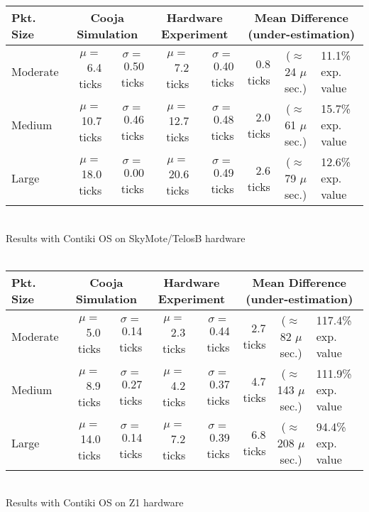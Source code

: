 \documentclass[a4paper,10pt]{article}
\begin{document}
\begin{sidewaystable}[!p]
\centering

\newcommand{\ticks}[1]{#1 ticks}
\newcommand{\moy}[1]{$\mu=$ \ticks{#1}}
\newcommand{\ect}[1]{$\sigma=$ \ticks{#1}}
\newcommand{\estus}[1]{($\approx$ #1 $\mu$sec.)}
\newcommand{\prctv}[1]{#1\% exp. value}

\begin{tabular}{|l|rr|rr|rcl|}
\hline
Pkt. Size & \multicolumn{2}{c|}{Cooja Simulation}
          & \multicolumn{2}{c|}{Hardware Experiment}
          & \multicolumn{3}{c|}{Mean Difference (under-estimation)} \\
\hline
 Moderate & \moy{6.4} & \ect{0.50} & \moy{7.2} & \ect{0.40}
          & 0.8 ticks & \estus{24} & \prctv{11.1} \\
 Medium   & \moy{10.7} & \ect{0.46} & \moy{12.7} & \ect{0.48}
          & 2.0 ticks & \estus{61} & \prctv{15.7} \\
 Large    & \moy{18.0} & \ect{0.00} & \moy{20.6} & \ect{0.49}
          & 2.6 ticks & \estus{79} & \prctv{12.6} \\
\hline
\end{tabular}
\\
Results with Contiki OS on SkyMote/TelosB hardware\\
\ \\

\begin{tabular}{|l|rr|rr|rcl|}
\hline
Pkt. Size & \multicolumn{2}{c|}{Cooja Simulation}
          & \multicolumn{2}{c|}{Hardware Experiment}
          & \multicolumn{3}{c|}{Mean Difference (under-estimation)} \\
\hline
 Moderate & \moy{5.0} & \ect{0.14} & \moy{2.3} & \ect{0.44}
          & 2.7 ticks & \estus{82} & \prctv{117.4} \\
 Medium   & \moy{8.9} & \ect{0.27} & \moy{4.2} & \ect{0.37}
          & 4.7 ticks & \estus{143} & \prctv{111.9} \\
 Large    & \moy{14.0} & \ect{0.14} & \moy{7.2} & \ect{0.39}
          & 6.8 ticks & \estus{208} & \prctv{94.4} \\
\hline
\end{tabular}
\\
Results with Contiki OS on Z1 hardware\\
\ \\


\end{sidewaystable}
\end{document}
